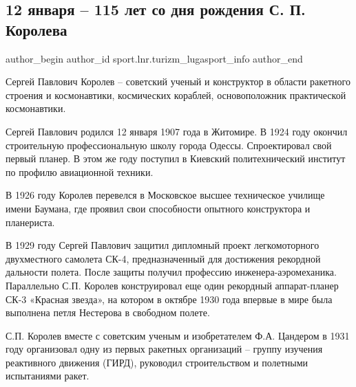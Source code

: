  
 
 
 
 
\subsection{12 января – 115 лет со дня рождения С. П. Королева}
\label{sec:12_01_2022.stz.sport.lnr.turizm_lugasport_info.1.korolev_115_let}

\ifcmt
 author_begin
   author_id sport.lnr.turizm_lugasport_info
 author_end
\fi

Сергей Павлович Королев – советский ученый и конструктор в области ракетного
строения и космонавтики,  космических кораблей, основоположник практической
космонавтики.

Сергей Павлович родился 12 января 1907 года в Житомире. В 1924 году окончил
строительную профессиональную школу города Одессы. Спроектировал свой первый
планер. В этом же году поступил в Киевский политехнический институт по профилю
авиационной техники.


В 1926 году Королев перевелся в Московское высшее техническое училище имени
Баумана, где проявил свои способности опытного конструктора и планериста.

В 1929 году Сергей Павлович защитил дипломный проект легкомоторного
двухместного самолета СК-4, предназначенный для достижения рекордной дальности
полета. После защиты получил профессию инженера-аэромеханика. Параллельно С.П.
Королев конструировал еще один рекордный аппарат-планер СК-3 «Красная звезда»,
на котором в октябре 1930 года впервые в мире была выполнена петля Нестерова в
свободном полете.

С.П. Королев вместе с советским ученым и изобретателем Ф.А. Цандером в 1931
году организовал одну из первых ракетных организаций – группу изучения
реактивного движения (ГИРД), руководил строительством и полетными испытаниями
ракет.


